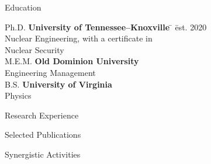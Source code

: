 \documentclass{resume3} %
\begin{document}

\begin{rSection}{Education}

\begin{tabbing}
Ph.D. \hspace*{2 em}\= \textbf{University of Tennessee--Knoxville} \hspace*{5em} \= \hspace*{15em} \= est. 2020 \\
      \> Nuclear Engineering, with a certificate in \\ \> Nuclear Security \\
%
M.E.M. \hspace*{2 em}\> \textbf{Old Dominion University} \>  \\
      \> Engineering Management \\
%
B.S. \hspace*{2 em}\> \textbf{University of Virginia} \>  \\
      \> Physics
\end{tabbing}
\end{rSection}

\begin{rSection}{Research Experience}

\end{rSection}

\begin{rSection}{Selected Publications}

\end{rSection}

\vspace*{0.5em}
\begin{rSection}{Synergistic Activities}

\end{rSection}

\end{document}
